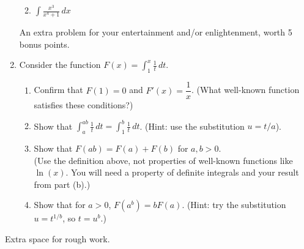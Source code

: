 \documentclass[12pt]{article}
\newcommand{\points}[1]{\marginpar{\hspace{24pt}[#1]}}
\newcommand{\di}{\displaystyle}
\begin{document}
\begin{enumerate}
\begin{enumerate}
  \vspace{2in}
  
  \item $\di \int \frac{x^3}{x^4+1}\,dx$ \points{3}
 
  \end{enumerate}  


\newpage

An extra problem for your entertainment and/or enlightenment, worth 5 bonus points.

\bigskip
\item Consider the function $\di F(x) = \int_1^x \frac{1}{t}\,dt$.
\begin{enumerate}
\item Confirm that $F(1)=0$ and $F'(x) = \dfrac{1}{x}$. (What well-known function satisfies these conditions?)

\vspace{0.75in}


\item Show that $\di \int_a^{ab} \frac{1}{t}\,dt = \int_1^b \frac{1}{t}\,dt$. (Hint: use the substitution $u=t/a$).

\vspace{1.75in}

\item Show that $F(ab)=F(a)+F(b)$ for $a,b>0$. \\
(Use the definition above, not properties of well-known functions like $\ln(x)$. You will need a property of definite integrals and your result from part (b).)

\vspace{1.5in}

\item Show that for $a>0$, $F(a^b) = bF(a)$. 
(Hint: try the substitution $u=t^{1/b}$, so $t=u^b$.)
\end{enumerate}
\end{enumerate}
\newpage

Extra space for rough work.
\end{document}
